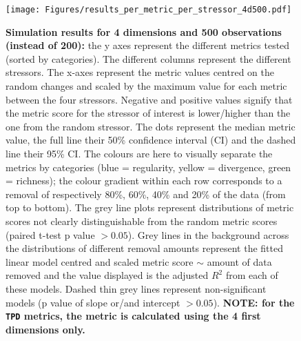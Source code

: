 \documentclass[12pt,letterpaper]{article}
\begin{document}
\begin{figure}[!htbp]
\centering
   \texttt{[image: Figures/results\_per\_metric\_per\_stressor\_4d500.pdf]}
\caption{\scriptsize{\textbf{Simulation results for 4 dimensions and 500 observations (instead of 200):} the y axes represent the different metrics tested (sorted by categories).
The different columns represent the different stressors. The x-axes represent the metric values centred on the random changes and scaled by the maximum value for each metric between the four stressors.
Negative and positive values signify that the metric score for the stressor of interest is lower/higher than the one from the random stressor.
The dots represent the median metric value, the full line their 50\% confidence interval (CI) and the dashed line their 95\% CI.
The colours are here to visually separate the metrics by categories (blue = regularity, yellow = divergence, green = richness); the colour gradient within each row corresponds to a removal of respectively 80\%, 60\%, 40\% and 20\% of the data (from top to bottom).
The grey line plots represent distributions of metric scores not clearly distinguishable from the random metric scores (paired t-test p value $> 0.05$).
Grey lines in the background across the distributions of different removal amounts represent the fitted linear model centred and scaled metric score $\sim$ amount of data removed and the value displayed is the adjusted $R^2$ from each of these models.
Dashed thin grey lines represent non-significant models (p value of slope or/and intercept $> 0.05$).
\textbf{NOTE: for the \texttt{TPD} metrics, the metric is calculated using the 4 first dimensions only.}
}}
\label{Fig:simulation_results_4d500}
\end{figure}
\bigskip
\end{document}

